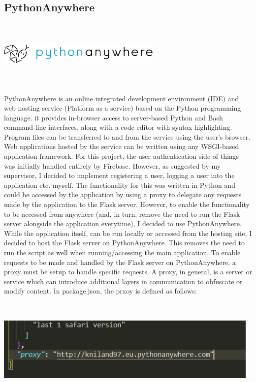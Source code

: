 \subsection{PythonAnywhere}
\par
\medskip
\begin{center}
    \includegraphics[width=8cm,height=3.3cm,keepaspectratio]{images/pythonanywhere}
\end{center}
PythonAnywhere is an online integrated development environment (IDE) and web
hosting service (Platform as a service) based on the Python programming 
language. it provides in-browser access to server-based Python and Bash 
command-line interfaces, along with a code editor with syntax highlighting. 
Program files can be transferred to and from the service using the user's 
browser. Web applications hosted by the service can be written using any 
WSGI-based application framework. For this project, the user authentication side
of things was initially handled entirely by Firebase. However, as suggested by 
my supervisor, I decided to implement registering a user, logging a user into 
the application etc. myself. The functionality for this was written in Python 
and could be accessed by the application by using a proxy to delegate any 
requests made by the application to the Flask server. However, to enable the 
functionality to be accessed from anywhere (and, in turn, remove the need to run
the Flask server alongside the application everytime), I decided to use 
PythonAnywhere. While the application itself, can be run locally or accessed from the hosting site, I decided to host the Flask server on PythonAnywhere. This removes the need to run the script as well when running/accessing the main application. To enable requests to be made and handled by the Flask server on PythonAnywhere, a proxy must be setup to handle specific requests. A proxy, in general, is a server or service which can introduce additional layers in communication to obfuscate or modify content. In package.json, the prxoy is defined as follows:

\begin{center}
    \includegraphics[width=13cm,height=5cm,keepaspectratio]{images/packagejson}
\end{center}

